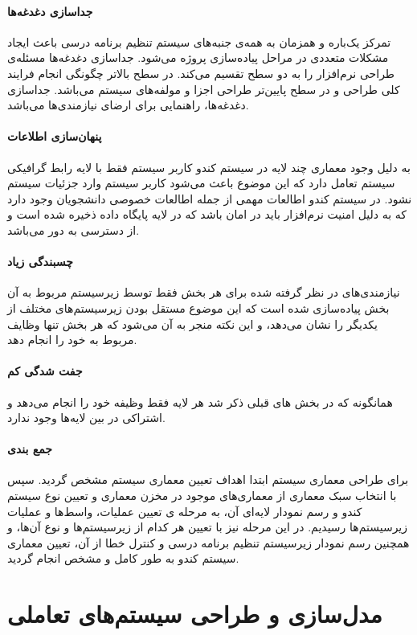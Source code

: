 \documentclass{report}
\begin{document}
\subsection{جداسازی دغدغه‌ها}
تمرکز یک‌باره و همزمان به همه‌ی جنبه‌های سیستم تنظیم برنامه درسی باعث ایجاد مشکلات متعددی در مراحل
پیاده‌سازی پروژه می‌شود. جداسازی دغدغه‌ها مسئله‌ی طراحی نرم‌افزار را به دو سطح تقسیم می‌کند. در سطح
بالاتر چگونگی انجام فرایند کلی طراحی و در سطح پایین‌تر طراحی اجزا و مولفه‌های سیستم می‌باشد.
جداسازی دغدغه‌ها، راهنمایی برای ارضای نیازمندی‌ها می‌باشد.
\subsection{پنهان‌سازی اطلاعات}
به دلیل وجود معماری چند لایه در سیستم کندو کاربر سیستم فقط با لایه رابط گرافیکی سیستم تعامل دارد که این
موضوع باعث می‌شود کاربر سیستم وارد جزئیات سیستم نشود. در سیستم کندو اطالعات مهمی از جمله
اطالعات خصوصی دانشجویان وجود دارد که به دلیل امنیت نرم‌افزار باید در امان باشد که در لایه پایگاه داده
ذخیره شده است و از دسترسی به دور می‌باشد.
\subsection{چسبندگی زیاد}
نیازمندی‌های در نظر گرفته شده برای هر بخش فقط توسط زیرسیستم مربوط به آن بخش پیاده‌سازی شده است که این موضوع مستقل بودن زیر‌سیستم‌های مختلف از یکدیگر را نشان می‌د‌هد، و این نکته منجر به آن می‌شود که هر بخش تنها وظایف مربوط به خود را انجام دهد.
\subsection{جفت شدگی کم}
همانگونه که در بخش های قبلی ذکر شد هر لایه فقط وظیفه خود را انجام می‌دهد
 و اشتراکی در بین لایه‌ها وجود ندارد.
\subsection{جمع بندی}
برای طراحی معماری سیستم ابتدا اهداف تعیین معماری سیستم
مشخص گردید. سپس با انتخاب سبک معماری از معماری‌های موجود در مخزن معماری و تعیین نوع سیستم
کندو و رسم نمودار لایه‌ای آن، به مرحله ی تعیین عملیات، واسط‌ها و عملیات زیرسیستم‌ها رسیدیم. در این
مرحله نیز با تعیین هر کدام از زیرسیستم‌ها و نوع آن‌ها، و همچنین رسم نمودار زیرسیستم تنظیم برنامه درسی
و کنترل خطا از آن، تعیین معماری سیستم کندو به طور کامل و مشخص انجام
گردید.

\part{مدل‌سازی و طراحی سیستم‌های تعاملی}
\end{document}
